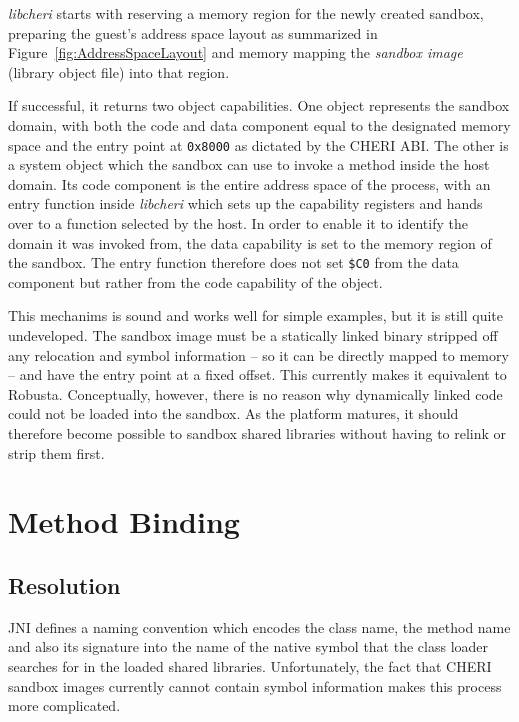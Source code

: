 \documentclass[a4paper,12pt,twoside,openright]{report}
\newcommand{\reg}[1]{\texttt{\$#1}}
\newcommand{\tool}[1]{\emph{#1}}
\newcommand{\lib}[1]{\tool{lib#1}}
\begin{document}
\lib{cheri} starts with reserving a memory region for the newly created sandbox, preparing the guest's address space layout as summarized in Figure~\ref{fig:AddressSpaceLayout} and memory mapping the \emph{sandbox image} (library object file) into that region. \label{sec:AddressSpaceLayout}

If successful, it returns two object capabilities. One object represents the sandbox domain, with both the code and data component equal to the designated memory space and the entry point at \texttt{0x8000} as dictated by the CHERI ABI. \label{sec:SystemObject} The other is a system object which the sandbox can use to invoke a method inside the host domain. Its code component is the entire address space of the process, with an entry function inside \lib{cheri} which sets up the capability registers and hands over to a function selected by the host. In order to enable it to identify the domain it was invoked from, the data capability is set to the memory region of the sandbox. The entry function therefore does not set \reg{C0} from the data component but rather from the code capability of the object.

This mechanims is sound and works well for simple examples, but it is still quite undeveloped. The sandbox image must be a statically linked binary stripped off any relocation and symbol information -- so it can be directly mapped to memory -- and have the entry point at a fixed offset. This currently makes it equivalent to Robusta. Conceptually, however, there is no reason why dynamically linked code could not be loaded into the sandbox. As the platform matures, it should therefore become possible to sandbox shared libraries without having to relink or strip them first.

\section{Method Binding}

\subsection{Resolution}

JNI defines a naming convention which encodes the class name, the method name and also its signature into the name of the native symbol that the class loader searches for in the loaded shared libraries. Unfortunately, the fact that CHERI sandbox images currently cannot contain symbol information makes this process more complicated.
\end{document}
